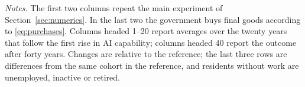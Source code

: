 \begin{table}[htbp]
\begin{tabularx}{\linewidth}
\bottomrule\end{tabularx}
\par\smallskip\begin{minipage}{\linewidth}\footnotesize\emph{Notes.} The first two columns repeat the main experiment of Section~\ref{sec:numerics}. In the last two the government buys final goods according to \eqref{eq:purchases}. Columns headed 1--20 report averages over the twenty years that follow the first rise in AI capability; columns headed 40 report the outcome after forty years. Changes are relative to the reference; the last three rows are differences from the same cohort in the reference, and residents without work are unemployed, inactive or retired.\end{minipage}
\end{table}
